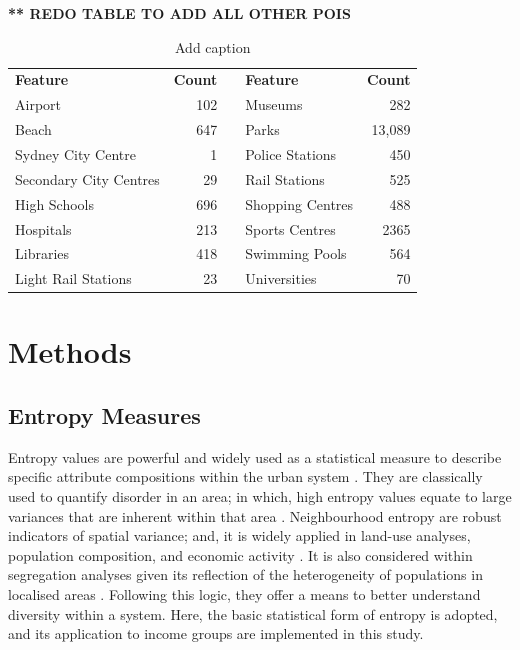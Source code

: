 \textbf{** REDO TABLE TO ADD ALL OTHER POIS}

\renewcommand{\baselinestretch}{0.8}
\begin{table}[!ht]
  \centering \small
    \begin{tabular}{lrrlr}
    \textbf{Feature} & \multicolumn{1}{l}{\textbf{Count}} &       & \textbf{Feature} & \multicolumn{1}{l}{\textbf{Count}} \\
\cmidrule{1-2}\cmidrule{4-5}    Airport & 102   &       & Museums & 282 \\
    Beach & 647   &       & Parks & 13,089 \\
    Sydney City Centre & 1     &       & Police Stations & 450 \\
    Secondary City Centres & 29    &       & Rail Stations & 525 \\
    High Schools & 696   &       & Shopping Centres & 488 \\
    Hospitals & 213   &       & Sports Centres & 2365 \\
    Libraries & 418   &       & Swimming Pools & 564 \\
    Light Rail Stations & 23    &       & Universities & 70 \\
\cmidrule{1-2}\cmidrule{4-5}    
\end{tabular}%
  \label{tab:pois}%
    \caption{Add caption}
\end{table}%

\section{Methods}
\label{sec:method}

\subsection{Entropy Measures}
Entropy values are powerful and widely used as a statistical measure to describe specific attribute compositions within the urban system \citep{batty2014entropy}. They are classically used to quantify disorder in an area; in which, high entropy values equate to large variances that are inherent within that area \citep{batty2014entropy, wilson2013entropy}. Neighbourhood entropy are robust indicators of spatial variance; and, it is widely applied in land-use analyses, population composition, and economic activity \citep{tan2003laws, wilson2013entropy}. It is also considered within segregation analyses given its reflection of the heterogeneity of populations in localised areas \citep{fischer2003relative}. Following this logic, they offer a means to better understand diversity within a system. Here, the basic statistical form of entropy is adopted, and its application to income groups are implemented in this study. \\

